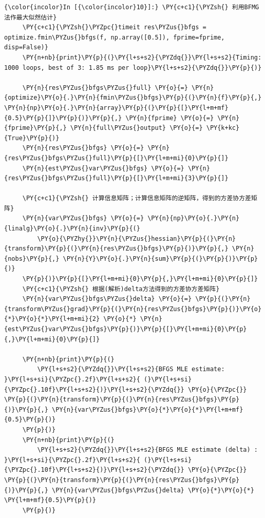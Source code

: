 \begin{Verbatim}[commandchars=\\\{\}]
{\color{incolor}In [{\color{incolor}10}]:} \PY{c+c1}{\PYZsh{} 利用BFMG法作最大似然估计}
     \PY{c+c1}{\PYZsh{}\PYZpc{}timeit res\PYZus{}bfgs = optimize.fmin\PYZus{}bfgs(f, np.array([0.5]), fprime=fprime, disp=False)}
     \PY{n+nb}{print}\PY{p}{(}\PY{l+s+s2}{\PYZdq{}}\PY{l+s+s2}{Timing: 1000 loops, best of 3: 1.85 ms per loop}\PY{l+s+s2}{\PYZdq{}}\PY{p}{)}

     \PY{n}{res\PYZus{}bfgs\PYZus{}full} \PY{o}{=} \PY{n}{optimize}\PY{o}{.}\PY{n}{fmin\PYZus{}bfgs}\PY{p}{(}\PY{n}{f}\PY{p}{,} \PY{n}{np}\PY{o}{.}\PY{n}{array}\PY{p}{(}\PY{p}{[}\PY{l+m+mf}{0.5}\PY{p}{]}\PY{p}{)}\PY{p}{,} \PY{n}{fprime} \PY{o}{=} \PY{n}{fprime}\PY{p}{,} \PY{n}{full\PYZus{}output} \PY{o}{=} \PY{k+kc}{True}\PY{p}{)}
     \PY{n}{res\PYZus{}bfgs} \PY{o}{=} \PY{n}{res\PYZus{}bfgs\PYZus{}full}\PY{p}{[}\PY{l+m+mi}{0}\PY{p}{]}
     \PY{n}{est\PYZus{}var\PYZus{}bfgs} \PY{o}{=} \PY{n}{res\PYZus{}bfgs\PYZus{}full}\PY{p}{[}\PY{l+m+mi}{3}\PY{p}{]}

     \PY{c+c1}{\PYZsh{} 计算信息矩阵；计算信息矩阵的逆矩阵，得到的方差协方差矩阵}
     \PY{n}{var\PYZus{}bfgs} \PY{o}{=} \PY{n}{np}\PY{o}{.}\PY{n}{linalg}\PY{o}{.}\PY{n}{inv}\PY{p}{(}
         \PY{o}{\PYZhy{}}\PY{n}{\PYZus{}hessian}\PY{p}{(}\PY{n}{transform}\PY{p}{(}\PY{n}{res\PYZus{}bfgs}\PY{p}{)}\PY{p}{,} \PY{n}{nobs}\PY{p}{,} \PY{n}{Y}\PY{o}{.}\PY{n}{sum}\PY{p}{(}\PY{p}{)}\PY{p}{)}
     \PY{p}{)}\PY{p}{[}\PY{l+m+mi}{0}\PY{p}{,}\PY{l+m+mi}{0}\PY{p}{]}
     \PY{c+c1}{\PYZsh{} 根据(解析)delta方法得到的方差协方差矩阵}
     \PY{n}{var\PYZus{}bfgs\PYZus{}delta} \PY{o}{=} \PY{p}{(}\PY{n}{transform\PYZus{}grad}\PY{p}{(}\PY{n}{res\PYZus{}bfgs}\PY{p}{)}\PY{o}{*}\PY{o}{*}\PY{l+m+mi}{2} \PY{o}{*} \PY{n}{est\PYZus{}var\PYZus{}bfgs}\PY{p}{)}\PY{p}{[}\PY{l+m+mi}{0}\PY{p}{,}\PY{l+m+mi}{0}\PY{p}{]}

     \PY{n+nb}{print}\PY{p}{(}
         \PY{l+s+s2}{\PYZdq{}}\PY{l+s+s2}{BFGS MLE estimate: }\PY{l+s+si}{\PYZpc{}.2f}\PY{l+s+s2}{ (}\PY{l+s+si}{\PYZpc{}.10f}\PY{l+s+s2}{)}\PY{l+s+s2}{\PYZdq{}} \PY{o}{\PYZpc{}} \PY{p}{(}\PY{n}{transform}\PY{p}{(}\PY{n}{res\PYZus{}bfgs}\PY{p}{)}\PY{p}{,} \PY{n}{var\PYZus{}bfgs}\PY{o}{*}\PY{o}{*}\PY{l+m+mf}{0.5}\PY{p}{)}
     \PY{p}{)}
     \PY{n+nb}{print}\PY{p}{(}
         \PY{l+s+s2}{\PYZdq{}}\PY{l+s+s2}{BFGS MLE estimate (delta) : }\PY{l+s+si}{\PYZpc{}.2f}\PY{l+s+s2}{ (}\PY{l+s+si}{\PYZpc{}.10f}\PY{l+s+s2}{)}\PY{l+s+s2}{\PYZdq{}} \PY{o}{\PYZpc{}} \PY{p}{(}\PY{n}{transform}\PY{p}{(}\PY{n}{res\PYZus{}bfgs}\PY{p}{)}\PY{p}{,} \PY{n}{var\PYZus{}bfgs\PYZus{}delta} \PY{o}{*}\PY{o}{*} \PY{l+m+mf}{0.5}\PY{p}{)}
     \PY{p}{)}
\end{Verbatim}


